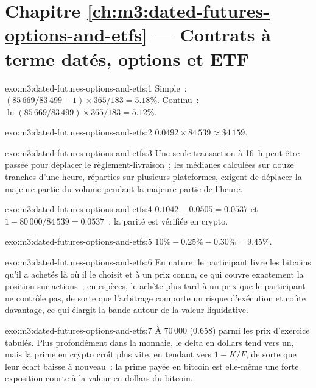 \section*{Chapitre \ref{ch:m3:dated-futures-options-and-etfs} --- Contrats à terme datés, options et ETF}

\begin{solution}{exo:m3:dated-futures-options-and-etfs:1}
Simple~: $(85\,669/83\,499 - 1) \times 365/183 = 5.18\%$. Continu~: $\ln(85\,669/83\,499) \times 365/183 = 5.12\%$.
\end{solution}

\begin{solution}{exo:m3:dated-futures-options-and-etfs:2}
$0.0492 \times 84\,539 \approx \$4\,159$.
\end{solution}

\begin{solution}{exo:m3:dated-futures-options-and-etfs:3}
Une seule transaction à 16~h peut être passée pour déplacer le règlement-livraison~; les médianes calculées sur douze tranches d'une heure, réparties sur plusieurs plateformes,
exigent de déplacer la majeure partie du volume pendant la majeure partie de l'heure.
\end{solution}

\begin{solution}{exo:m3:dated-futures-options-and-etfs:4}
$0.1042 - 0.0505 = 0.0537$ et $1 - 80\,000/84\,539 = 0.0537$~: la parité est vérifiée en crypto.
\end{solution}

\begin{solution}{exo:m3:dated-futures-options-and-etfs:5}
$10\% - 0.25\% - 0.30\% = 9.45\%$.
\end{solution}

\begin{solution}{exo:m3:dated-futures-options-and-etfs:6}
En nature, le participant livre les bitcoins qu'il a achetés là où il le choisit et à un prix connu, ce qui couvre exactement la position sur actions~; en
espèces, le  achète plus tard à un prix que le participant ne contrôle pas, de sorte que l'arbitrage comporte un risque d'exécution et coûte davantage, ce qui
élargit la bande autour de la valeur liquidative.
\end{solution}

\begin{solution}{exo:m3:dated-futures-options-and-etfs:7}
À 70\,000 (0.658) parmi les prix d'exercice tabulés. Plus profondément dans la monnaie, le delta en dollars tend vers un, mais la prime en crypto croît
plus vite, en tendant vers $1 - K/F$, de sorte que leur écart baisse à nouveau~: la prime payée en bitcoin est elle-même une forte exposition courte
à la valeur en dollars du bitcoin.
\end{solution}

